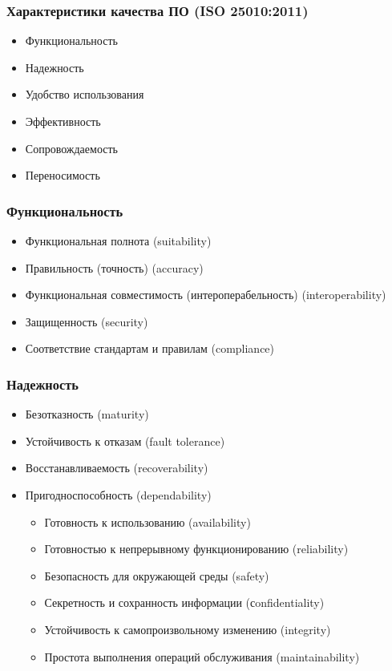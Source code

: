 \documentclass{../../slides-style}
\begin{document}
    \begin{frame}
        \frametitle{Характеристики качества ПО (ISO 25010:2011)}
        \begin{itemize}
            \item Функциональность
            \item Надежность
            \item Удобство использования
            \item Эффективность
            \item Сопровождаемость
            \item Переносимость
        \end{itemize}
    \end{frame}

    \begin{frame}
        \frametitle{Функциональность}
        \begin{itemize}
            \item Функциональная полнота (suitability)
            \item Правильность (точность) (accuracy)
            \item Функциональная совместимость (интероперабельность) (interoperability)
            \item Защищенность (security)
            \item Соответствие стандартам и правилам (compliance)
        \end{itemize}
    \end{frame}

    \begin{frame}
        \frametitle{Надежность}
        \begin{itemize}
            \item Безотказность (maturity)
            \item Устойчивость к отказам (fault tolerance)
            \item Восстанавливаемость (recoverability)
            \item Пригодноспособность (dependability)
            \begin{itemize}
                \item Готовность к использованию (availability)
                \item Готовностью к непрерывному функционированию (reliability)
                \item Безопасность для окружающей среды (safety)
                \item Секретность и сохранность информации (сonfidentiality)
                \item Устойчивость к самопроизвольному изменению (integrity)
                \item Простота выполнения операций обслуживания (maintainability)
            \end{itemize}
        \end{itemize}
    \end{frame}
\end{document}
